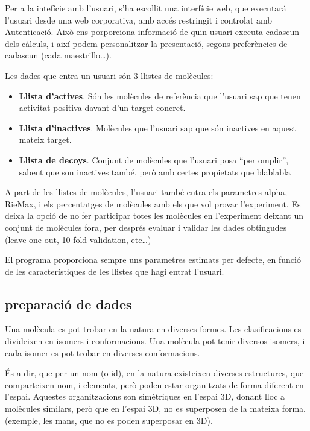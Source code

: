 \documentclass[titlepage,a4paper,12pt]{book}
\begin{document}
Per a la intefície amb l'usuari, s'ha escollit una interfície web, que executará
l'usuari desde una web corporativa, amb accés restringit i controlat amb
Autenticació.  Això ens porporciona informació de quin usuari executa cadascun
dels càlculs, i així podem personalitzar la presentació, segons preferències de
cadascun (cada maestrillo\dots). 

Les dades que entra un usuari són 3 llistes de molècules:

\begin{itemize}
	\item \textbf{Llista d'actives}.  Són les molècules de referència que l'usuari sap
	que tenen activitat positiva davant d'un target concret.
	\item \textbf{Llista d'inactives}.  Molècules que l'usuari sap que són inactives en
	aquest mateix target.
	\item \textbf{Llista de decoys}.  Conjunt de molècules que l'usuari posa ``per
	omplir'', sabent que son inactives també, però amb certes propietats que
	blablabla %
\end{itemize}

A part de les llistes de molècules, l'usuari també entra els parametres alpha,
RieMax, i els percentatges de molècules amb els que vol provar l'experiment.  Es
deixa la opció de no fer participar totes les molècules en l'experiment deixant 
un conjunt de molècules fora, per després evaluar i validar les dades obtingudes
(leave one out, 10 fold validation, etc\dots)

El programa proporciona sempre uns parametres estimats per defecte, en funció de
les característiques de les llistes que hagi entrat l'usuari. 

\subsection{preparació de dades} %
\label{sub:preparacio de dades}
Una molècula es pot trobar en la natura en diverses formes.  Les clasificacions
es divideixen en isomers i conformacions.  Una molècula pot tenir diversos
isomers, i cada isomer es pot trobar en  diverses conformacions.

És a dir, que per un nom (o id), en la natura existeixen diverses estructures, que
comparteixen nom, i elements, però poden estar organitzats de forma diferent en
l'espai. Aquestes organitzacions son simètriques en l'espai 3D, donant lloc a
molècules similars, però que en l'espai 3D, no es superposen de la mateixa
forma. (exemple, les mans, que no es poden superposar en 3D).
\end{document}
